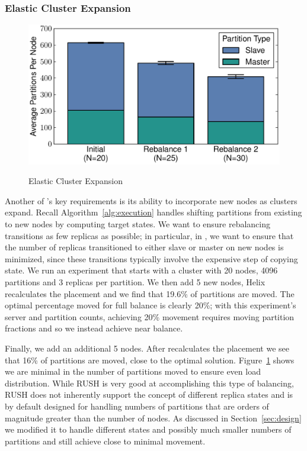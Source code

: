 \subsubsection{Elastic Cluster Expansion}
\label{sec:elastic}
%
\begin{figure}[t]
    {\includegraphics[width=\columnwidth]{rebalance.pdf}}
    \vspace*{-2ex}
    \caption{\label{fig:cluster_expansion} Elastic Cluster Expansion }
\end{figure}

Another of \helix's key requirements is its ability to incorporate new nodes as
clusters expand.  Recall Algorithm~\ref{alg:execution}
handles shifting partitions from existing to new nodes by computing target
states. 
We want to ensure rebalancing transitions as few replicas as possible; in
particular, in \ES, we want to ensure that the number of replicas transitioned to either
slave or master on new nodes is minimized, since these transitions typically
involve the expensive step of copying state.
We run an experiment that starts with a cluster with 20 nodes,
4096 partitions and 3 replicas per partition. We then add 5 new nodes, Helix
recalculates the placement and we find that 19.6\% of partitions are moved.  The
optimal percentage moved for full balance is clearly 20\%; with this
experiment's server and partition counts, achieving 20\% movement requires
moving partition fractions and so we instead achieve near balance.

Finally, we add an additional 5 nodes. After \helix recalculates the
placement we see that 16\% of partitions are moved, close to the optimal
solution. 
Figure~\ref{fig:cluster_expansion} shows we are minimal in
the number of partitions moved to ensure even load distribution.
While RUSH is very good at accomplishing this type of balancing, RUSH does not inherently support the 
concept of different replica states and is by default
designed for handling numbers of partitions that are orders of magnitude greater
than the number of nodes.  As discussed in Section~\ref{sec:design} we modified it to handle different states and
possibly much smaller numbers of partitions and still achieve close to minimal
movement.

